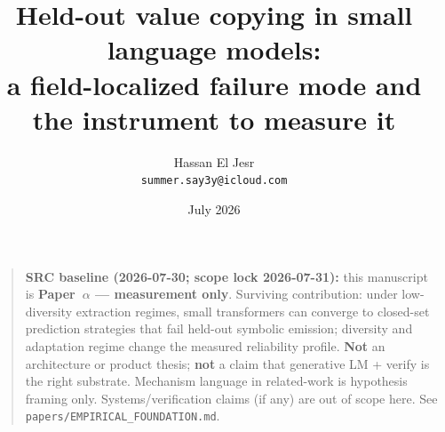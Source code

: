 \documentclass[11pt]{article}
\title{Held-out value copying in small language models:\\ a field-localized failure mode and the instrument to measure it}
\author{Hassan El Jesr\\ \texttt{summer.say3y@icloud.com}}
\date{July 2026}
\begin{document}

\maketitle

\begin{quote}
\small
\textbf{SRC baseline (2026-07-30; scope lock 2026-07-31):}
this manuscript is \textbf{Paper~$\alpha$ --- measurement only}.
Surviving contribution: under low-diversity extraction regimes, small transformers can converge to closed-set prediction strategies that fail held-out symbolic emission; diversity and adaptation regime change the measured reliability profile.
\textbf{Not} an architecture or product thesis; \textbf{not} a claim that generative LM + verify is the right substrate.
Mechanism language in related-work is hypothesis framing only.
Systems/verification claims (if any) are out of scope here.
See \texttt{papers/EMPIRICAL\_FOUNDATION.md}.
\end{quote}
\end{document}
